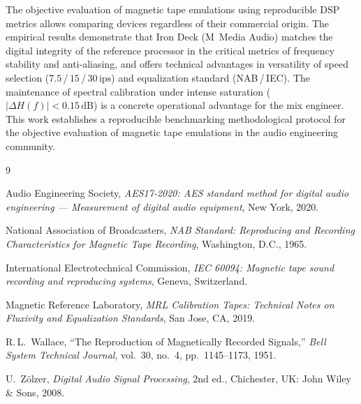 \documentclass[10pt,conference]{IEEEtran}
\begin{document}
The objective evaluation of magnetic tape emulations using reproducible DSP metrics allows comparing
devices regardless of their commercial origin. The empirical results demonstrate that Iron Deck
(M~Media Audio) matches the digital integrity of the reference processor in the critical metrics of
frequency stability and anti-aliasing, and offers technical advantages in versatility of speed
selection ($7.5$\,/\,$15$\,/\,$30\,\text{ips}$) and equalization standard (NAB\,/\,IEC).
The maintenance of spectral calibration under intense saturation ($|\Delta H(f)|<0.15\,\text{dB}$)
is a concrete operational advantage for the mix engineer. This work establishes a reproducible
benchmarking methodological protocol for the objective evaluation of magnetic tape emulations in
the audio engineering community.

\begin{thebibliography}{9}

Audio Engineering Society, \emph{AES17-2020: AES standard method for digital audio engineering
--- Measurement of digital audio equipment}, New York, 2020.

National Association of Broadcasters, \emph{NAB Standard: Reproducing and Recording
Characteristics for Magnetic Tape Recording}, Washington, D.C., 1965.

International Electrotechnical Commission, \emph{IEC 60094: Magnetic tape sound recording and
reproducing systems}, Geneva, Switzerland.

Magnetic Reference Laboratory, \emph{MRL Calibration Tapes: Technical Notes on Fluxivity and
Equalization Standards}, San Jose, CA, 2019.

R.\,L.\ Wallace, ``The Reproduction of Magnetically Recorded Signals,'' \emph{Bell System
Technical Journal}, vol.~30, no.~4, pp.~1145--1173, 1951.

U.\ Zölzer, \emph{Digital Audio Signal Processing}, 2nd ed., Chichester, UK: John Wiley \& Sons,
2008.

\end{thebibliography}
\end{document}
